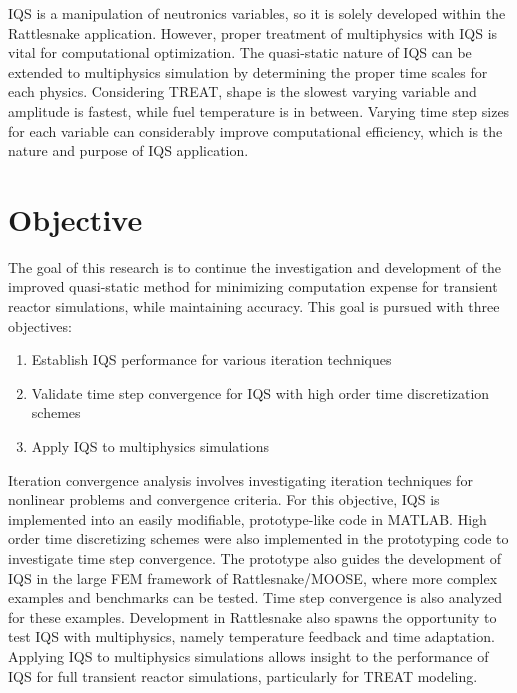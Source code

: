 IQS is a manipulation of neutronics variables, so it is solely developed within the Rattlesnake application. However, proper treatment of multiphysics with IQS is vital for computational optimization.  The quasi-static nature of IQS can be extended to multiphysics simulation by determining the proper time scales for each physics.  Considering TREAT, shape is the slowest varying variable and amplitude is fastest, while fuel temperature is in between.  Varying time step sizes for each variable can considerably improve computational efficiency, which is the nature and purpose of IQS application.

\section{Objective}

The goal of this research is to continue the investigation and development of the improved quasi-static method for minimizing computation expense for transient reactor simulations, while maintaining accuracy. This goal is pursued with three objectives:

\begin{enumerate}
\item Establish IQS performance for various iteration techniques
\item Validate time step convergence for IQS with high order time discretization schemes
\item Apply IQS to multiphysics simulations
\end{enumerate}

Iteration convergence analysis involves investigating iteration techniques for nonlinear problems and convergence criteria. For this objective, IQS is implemented into an easily modifiable, prototype-like code in MATLAB. High order time discretizing schemes were also implemented in the prototyping code to investigate time step convergence. The prototype also guides the development of IQS in the large FEM framework of Rattlesnake/MOOSE, where more complex examples and benchmarks can be tested.  Time step convergence is also analyzed for these examples. Development in Rattlesnake also spawns the opportunity to test IQS with multiphysics, namely temperature feedback and time adaptation. Applying IQS to multiphysics simulations allows insight to the performance of IQS for full transient reactor simulations, particularly for TREAT modeling.


